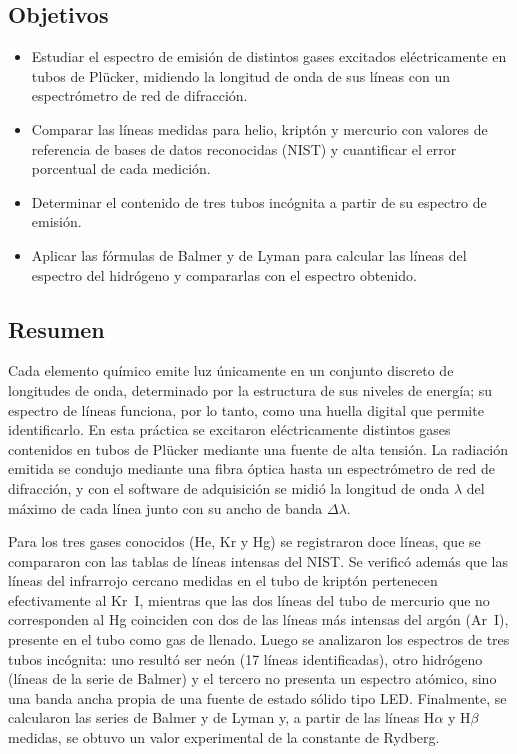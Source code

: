 \documentclass{article}
\begin{document}
\subsection{Objetivos}

\begin{itemize}
    \item Estudiar el espectro de emisión de distintos gases excitados eléctricamente en tubos de Plücker, midiendo la longitud de onda de sus líneas con un espectrómetro de red de difracción.
    \item Comparar las líneas medidas para helio, kriptón y mercurio con valores de referencia de bases de datos reconocidas (NIST) y cuantificar el error porcentual de cada medición.
    \item Determinar el contenido de tres tubos incógnita a partir de su espectro de emisión.
    \item Aplicar las fórmulas de Balmer y de Lyman para calcular las líneas del espectro del hidrógeno y compararlas con el espectro obtenido.
\end{itemize}

\subsection{Resumen}

Cada elemento químico emite luz únicamente en un conjunto discreto de longitudes de onda, determinado por la estructura de sus niveles de energía; su espectro de líneas funciona, por lo tanto, como una huella digital que permite identificarlo. En esta práctica se excitaron eléctricamente distintos gases contenidos en tubos de Plücker mediante una fuente de alta tensión. La radiación emitida se condujo mediante una fibra óptica hasta un espectrómetro de red de difracción, y con el software de adquisición se midió la longitud de onda $\lambda$ del máximo de cada línea junto con su ancho de banda $\Delta\lambda$.

Para los tres gases conocidos (He, Kr y Hg) se registraron doce líneas, que se compararon con las tablas de líneas intensas del NIST. Se verificó además que las líneas del infrarrojo cercano medidas en el tubo de kriptón pertenecen efectivamente al Kr~I, mientras que las dos líneas del tubo de mercurio que no corresponden al Hg coinciden con dos de las líneas más intensas del argón (Ar~I), presente en el tubo como gas de llenado. Luego se analizaron los espectros de tres tubos incógnita: uno resultó ser neón (17 líneas identificadas), otro hidrógeno (líneas de la serie de Balmer) y el tercero no presenta un espectro atómico, sino una banda ancha propia de una fuente de estado sólido tipo LED. Finalmente, se calcularon las series de Balmer y de Lyman y, a partir de las líneas H$\alpha$ y H$\beta$ medidas, se obtuvo un valor experimental de la constante de Rydberg.
\end{document}
